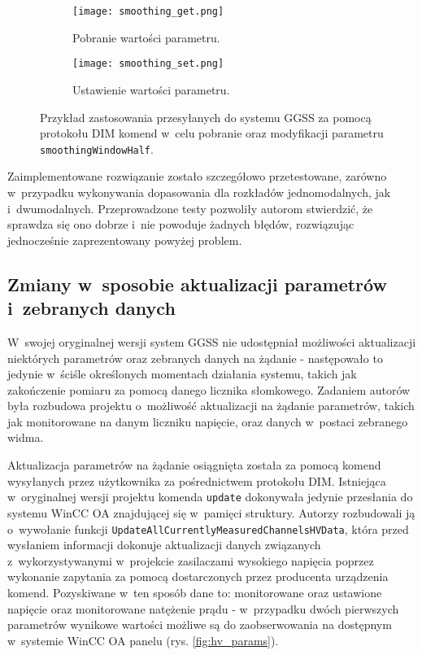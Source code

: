 \begin{figure}[H]
\centering

\begin{subfigure}{0.45\textwidth}
\centering
\texttt{[image: smoothing\_get.png]}
\caption{Pobranie wartości parametru.}
\label{fig:smoothing_get}
\end{subfigure}
\begin{subfigure}{0.45\textwidth}
\centering
\texttt{[image: smoothing\_set.png]}
\caption{Ustawienie wartości parametru.}
\label{fig:smoothing_set}
\end{subfigure}

\caption{Przykład zastosowania przesyłanych do systemu GGSS za pomocą protokołu DIM komend w~celu pobranie oraz modyfikacji parametru \lstinline{smoothingWindowHalf}.}
\label{fig:smoothing_param}
\end{figure}

Zaimplementowane rozwiązanie zostało szczegółowo przetestowane, zarówno w~przypadku wykonywania dopasowania dla rozkładów jednomodalnych, jak i~dwumodalnych. Przeprowadzone testy pozwoliły autorom stwierdzić, że sprawdza się ono dobrze i~nie powoduje żadnych błędów, rozwiązując jednocześnie zaprezentowany powyżej problem.


\clearpage
\subsection{Zmiany w~sposobie aktualizacji parametrów i~zebranych danych}
W~swojej oryginalnej wersji system GGSS nie udostępniał możliwości aktualizacji niektórych parametrów oraz zebranych danych na żądanie - następowało to jedynie w~ściśle określonych momentach działania systemu, takich jak zakończenie pomiaru za pomocą danego licznika słomkowego. Zadaniem autorów była rozbudowa projektu o~możliwość aktualizacji na żądanie parametrów, takich jak monitorowane na danym liczniku napięcie, oraz danych w~postaci zebranego widma.

Aktualizacja parametrów na żądanie osiągnięta została za pomocą komend wysyłanych przez użytkownika za pośrednictwem protokołu DIM. Istniejąca w~oryginalnej wersji projektu komenda \lstinline{update} dokonywała jedynie przesłania do systemu WinCC OA znajdującej się w~pamięci struktury. Autorzy rozbudowali ją o~wywołanie funkcji \lstinline{UpdateAllCurrentlyMeasuredChannelsHVData}, która przed wysłaniem informacji dokonuje aktualizacji danych związanych z~wykorzystywanymi w~projekcie zasilaczami wysokiego napięcia poprzez wykonanie zapytania za pomocą dostarczonych przez producenta urządzenia komend. Pozyskiwane w~ten sposób dane to: monitorowane oraz ustawione napięcie oraz monitorowane natężenie prądu - w~przypadku dwóch pierwszych parametrów wynikowe wartości możliwe są do zaobserwowania na dostępnym w~systemie WinCC OA panelu (rys. \ref{fig:hv_params}).

